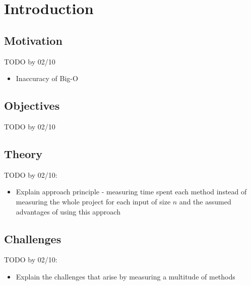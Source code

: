 \chapter{Introduction}

\section{Motivation}
TODO by 02/10
\begin{itemize}
  \item Inaccuracy of Big-O
\end{itemize}


\section{Objectives}
TODO by 02/10

\section{Theory}
TODO by 02/10:
\begin{itemize}
  \item Explain approach principle - measuring time spent each method instead of measuring the whole project for each input of size $n$ and the assumed advantages of using this approach
\end{itemize}

\section{Challenges}
TODO by 02/10:
\begin{itemize}
  \item Explain the challenges that arise by measuring a multitude of methods
\end{itemize}
